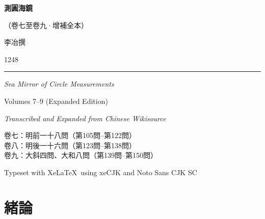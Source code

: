 \documentclass[11pt,a4paper]{article}
\newcommand{\shortline}{\noindent\rule{0.5\textwidth}{0.4pt}\par}
\begin{document}
\begin{titlepage}
\centering
\vspace*{2cm}

{\Huge\bfseries\color{titlecolor}\tradfont 測圓海鏡}

\vspace{0.5cm}
{\Large\color{sectioncolor}\tradfont （卷七至卷九·增補全本）}

\vspace{1.5cm}
{\LARGE\tradfont 李冶\quad 撰}

\vspace{0.3cm}
{\large 1248}

\vspace{2cm}
\shortline

\vspace{1cm}
{\large\textit{Sea Mirror of Circle Measurements}}

\vspace{0.3cm}
{\normalsize Volumes 7--9 (Expanded Edition)}

\vspace{0.5cm}
{\small\textit{Transcribed and Expanded from Chinese Wikisource}}

\vspace{2cm}
{\small\tradfont
卷七：明前一十八問\quad（第105問--第122問）\\[0.3em]
卷八：明後一十六問\quad（第123問--第138問）\\[0.3em]
卷九：大斜四問、大和八問\quad（第139問--第150問）
}

\vfill
{\small Typeset with Xe\LaTeX\ using xeCJK and Noto Sans CJK SC}

\end{titlepage}

\tableofcontents
\newpage

\section*{緒論}
\end{document}

